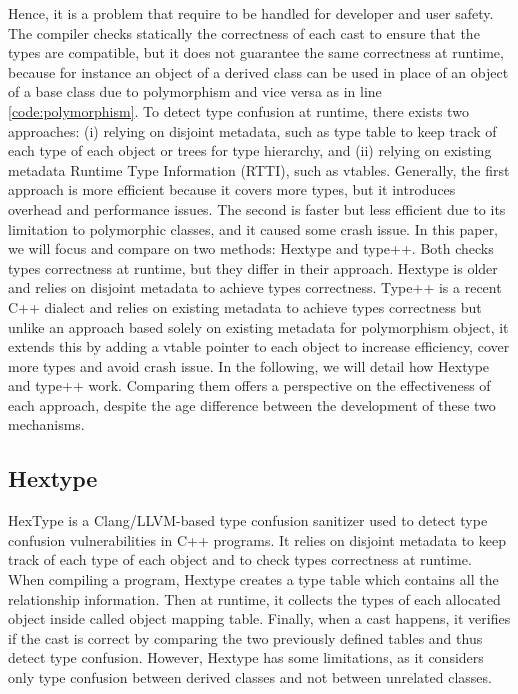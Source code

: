 \documentclass[a4paper,11pt,oneside]{report}
\begin{document}
Hence, it is a problem that require to be handled for developer and user safety.
The compiler checks statically the correctness of each cast to ensure that the
types are compatible, but it does not guarantee the same correctness at runtime, 
because for instance an object of a derived class can be used in place of an
object of a base class due to polymorphism and vice versa as in line
\ref{code:polymorphism}.  To detect type confusion at runtime, there exists two
approaches: (i) relying on disjoint metadata, such as type table to keep track
of each type of each object or trees for type hierarchy, and (ii) relying on
existing metadata Runtime Type Information (RTTI), such as vtables. 
Generally, the first approach is more efficient because it covers more types, but
it introduces overhead and performance issues. The second is faster but less
efficient due to its limitation to polymorphic classes, and it caused some crash
issue.  In this paper, we will focus and compare on two methods: Hextype and
type++.  Both checks types correctness at runtime, but they differ in their
approach. Hextype is older and relies on disjoint metadata to achieve types
correctness.  Type++ is a recent C++ dialect and relies on existing metadata to
achieve types correctness but unlike an approach based solely on existing
metadata for polymorphism object, it extends this by adding a vtable pointer to
each object to increase efficiency, cover more types and avoid crash issue. In
the following, we will detail how Hextype and type++ work.  Comparing them
offers a perspective on the effectiveness of each approach, despite the age
difference between the development of these two mechanisms.

\subsection{Hextype}

HexType is a Clang/LLVM-based type confusion sanitizer used to detect type
confusion vulnerabilities in C++ programs.  It relies on disjoint metadata to
keep track of each type of each object and to check types correctness at
runtime. When compiling a program, Hextype creates a type table which contains
all the relationship information. Then at runtime, it collects the types 
of each allocated object inside called object mapping table. Finally, when a cast happens,
it verifies if the cast is correct by comparing the two previously defined tables and 
thus detect type confusion. However, Hextype has some limitations, as it considers only 
type confusion between derived classes and not between unrelated classes.
\end{document}
